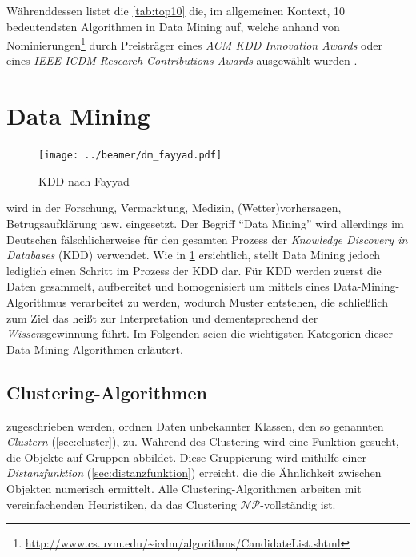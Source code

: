 \documentclass[12pt,journal,compsoc,ngerman]{IEEEtran}
\begin{document}
Währenddessen listet die \cref{tab:top10} die, im allgemeinen Kontext, 10 bedeutendsten Algorithmen in Data Mining auf, welche anhand von Nominierungen\footnote{\url{http://www.cs.uvm.edu/~icdm/algorithms/CandidateList.shtml}} durch Preisträger eines \emph{ACM KDD Innovation Awards} oder eines \emph{IEEE ICDM Research Contributions Awards} ausgewählt wurden \cite{wu2008top}.


\section{Data Mining}

\begin{figure}[!b]
	
  \centering
  \hspace{-4em}
  \texttt{[image: ../beamer/dm\_fayyad.pdf]}
  \caption{KDD nach Fayyad \cite{fayyad1996data}}
  \label{fig:kdd}
\end{figure}
  
 wird in der Forschung, Vermarktung, Medizin, (Wetter)vorhersagen, Betrugsaufklärung usw. eingesetzt. Der Begriff \enquote{Data Mining} wird allerdings im Deutschen fälschlicherweise für den gesamten Prozess der \emph{Knowledge Discovery in Databases} (KDD) verwendet. Wie in \cref{fig:kdd} ersichtlich, stellt Data Mining jedoch lediglich einen Schritt im Prozess der KDD dar. Für KDD werden zuerst die Daten gesammelt, aufbereitet und homogenisiert um mittels eines Data-Mining-Algorithmus verarbeitet zu werden, wodurch Muster entstehen, die schließlich zum Ziel das heißt zur Interpretation und dementsprechend der \emph{Wissen}sgewinnung führt. Im Folgenden seien die wichtigsten Kategorien dieser Data-Mining-Algorithmen erläutert.

 
\subsection{Clustering-Algorithmen}

 zugeschrieben werden, ordnen Daten unbekannter Klassen, den so genannten \emph{Clustern} (\cref{sec:cluster}), zu. Während des Clustering wird eine Funktion gesucht, die Objekte auf Gruppen abbildet. Diese Gruppierung wird mithilfe einer \emph{Distanzfunktion} (\cref{sec:distanzfunktion}) erreicht, die die Ähnlichkeit zwischen Objekten numerisch ermittelt. Alle Clustering-Algorithmen arbeiten mit vereinfachenden Heuristiken, da das Clustering $\mathcal{NP}$-vollständig ist. 
\end{document}
